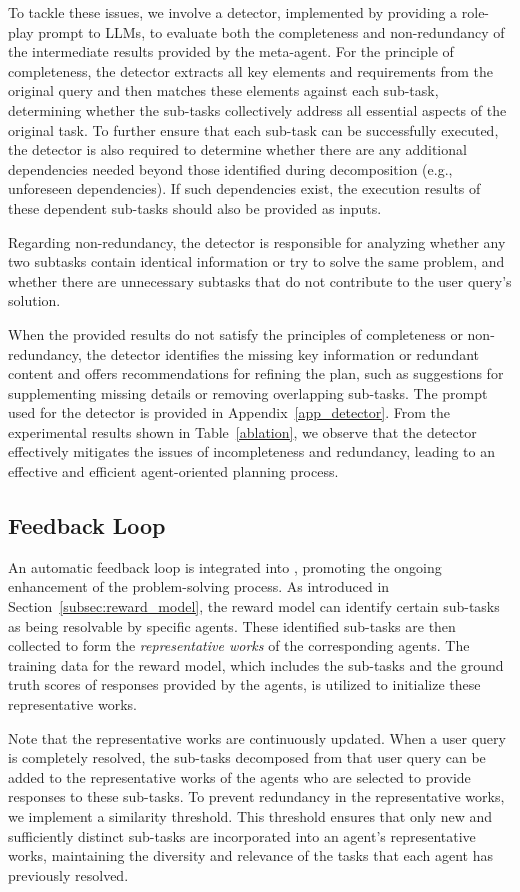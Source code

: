 To tackle these issues, we involve a detector, implemented by providing a role-play prompt to LLMs, to evaluate both the completeness and non-redundancy of the intermediate results provided by the meta-agent.
For the principle of completeness, the detector extracts all key elements and requirements from the original query and then matches these elements against each sub-task, determining whether the sub-tasks collectively address all essential aspects of the original task. 
To further ensure that each sub-task can be successfully executed, the detector is also required to determine whether there are any additional dependencies needed beyond those identified during decomposition (e.g., unforeseen dependencies). If such dependencies exist, the execution results of these dependent sub-tasks should also be provided as inputs.


Regarding non-redundancy, the detector is responsible for analyzing whether any two subtasks contain identical information or try to solve the same problem, and whether there are unnecessary subtasks that do not contribute to the user query's solution.

When the provided results do not satisfy the principles of completeness or non-redundancy, the detector identifies the missing key information or redundant content and offers recommendations for refining the plan, such as suggestions for supplementing missing details or removing overlapping sub-tasks. 
The prompt used for the detector is provided in Appendix~\ref{app_detector}.
From the experimental results shown in Table~\ref{ablation}, we observe that the detector effectively mitigates the issues of incompleteness and redundancy, leading to an effective and efficient agent-oriented planning process. 


\subsection{Feedback Loop}
\label{subsec:feedback_loop}

An automatic feedback loop is integrated into \name, promoting the ongoing enhancement of the problem-solving process.
As introduced in Section~\ref{subsec:reward_model}, the reward model can identify certain sub-tasks as being resolvable by specific agents.
These identified sub-tasks are then collected to form the {\it representative works} of the corresponding agents. The training data for the reward model, which includes the sub-tasks and the ground truth scores of responses provided by the agents, is utilized to initialize these representative works.

Note that the representative works are continuously updated. When a user query is completely resolved, the sub-tasks decomposed from that user query can be added to the representative works of the agents who are selected to provide responses to these sub-tasks.
To prevent redundancy in the representative works, we implement a similarity threshold. This threshold ensures that only new and sufficiently distinct sub-tasks are incorporated into an agent's representative works, maintaining the diversity and relevance of the tasks that each agent has previously resolved.



